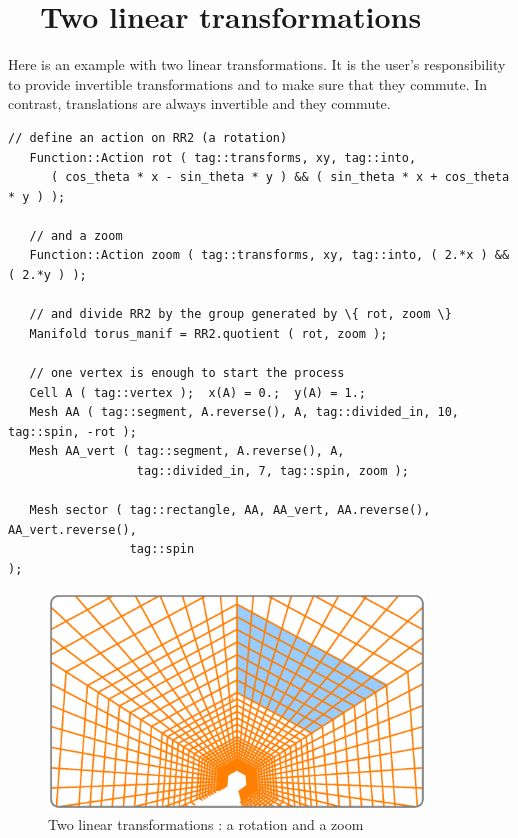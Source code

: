 \section{~~Two linear transformations}\label{\numb section 7.\numb parag 13}

Here is an example with two linear transformations.
It is the user's responsibility to provide invertible transformations and
to make sure that they commute.
In contrast, translations are always invertible and they commute.

\begin{Verbatim}[commandchars=\\\{\},formatcom=\small\tt,frame=single,
   label=parag-\ref{\numb section 7.\numb parag 13}.cpp,rulecolor=\color{coment},
   baselinestretch=0.94,framesep=2mm                                             ]
   // define an action on RR2 (a rotation)
   Function::Action rot ( tag::transforms, xy, tag::into,
      ( cos_theta * x - sin_theta * y ) && ( sin_theta * x + cos_theta * y ) );

   // and a zoom
   Function::Action zoom ( tag::transforms, xy, tag::into, ( 2.*x ) && ( 2.*y ) );

   // and divide RR2 by the group generated by \{ rot, zoom \}
   Manifold torus_manif = RR2.quotient ( rot, zoom );

   // one vertex is enough to start the process
   Cell A ( tag::vertex );  x(A) = 0.;  y(A) = 1.;
   Mesh AA ( tag::segment, A.reverse(), A, tag::divided_in, 10, tag::spin, -rot );
   Mesh AA_vert ( tag::segment, A.reverse(), A,
                  tag::divided_in, 7, tag::spin, zoom );

   Mesh sector ( tag::rectangle, AA, AA_vert, AA.reverse(), AA_vert.reverse(),
                 tag::spin                                                    );
\end{Verbatim}
  
\begin{figure}[ht] \centering
  \includegraphics[width=100mm]{sector-3.eps}
  \caption{Two linear transformations : a rotation and a zoom}
  \label{\numb section 7.\numb fig 9}
\end{figure}
